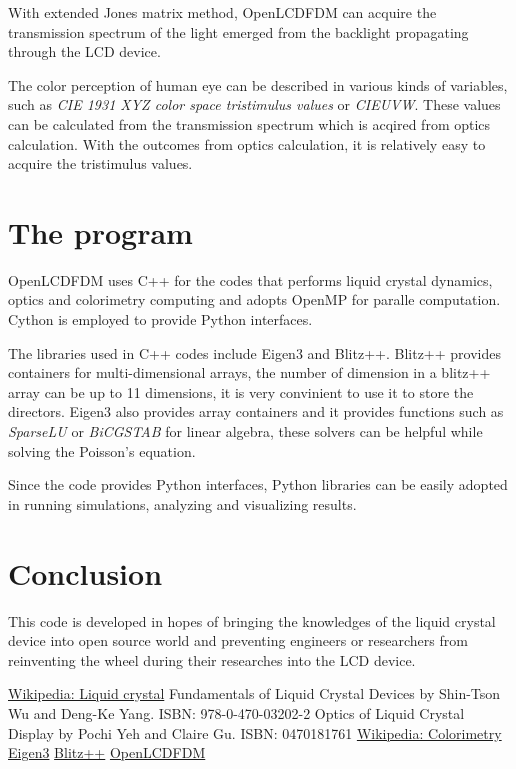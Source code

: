 \documentclass[11pt, a4paper]{article} %
\begin{document}
\begin{multicols}{2}
With extended Jones matrix method, OpenLCDFDM can acquire the transmission spectrum of the light emerged from the backlight propagating through the LCD device.

The color perception of human eye can be described in various kinds of variables, such as \emph{CIE 1931 XYZ color space tristimulus values} or \emph{CIEUVW}\cite{wiki_colorimetry}. These values can be calculated from the transmission spectrum which is acqired from optics calculation. With the outcomes from optics calculation, it is relatively easy to acquire the tristimulus values.

\section{The program}
OpenLCDFDM uses C++ for the codes that performs liquid crystal dynamics, optics and colorimetry computing and adopts OpenMP for paralle computation. Cython is employed to provide Python interfaces. 

The libraries used in C++ codes include Eigen3\cite{libeigen} and Blitz++\cite{blitz}. Blitz++ provides containers for multi-dimensional arrays, the number of dimension in a blitz++ array can be up to 11 dimensions, it is very convinient to use it to store the directors. Eigen3 also provides array containers and it provides functions such as \emph{SparseLU} or \emph{BiCGSTAB} for linear algebra, these solvers can be helpful while solving the Poisson's equation.

Since the code provides Python interfaces, Python libraries can be easily adopted in running simulations, analyzing and visualizing results.

\section{Conclusion}
This code is developed in hopes of bringing the knowledges of the liquid crystal device into open source world and preventing engineers or researchers from reinventing the wheel during their researches into the LCD device.

\begin{thebibliography}{7}
\href{http://en.wikipedia.org/wiki/Liquid_crystal}{Wikipedia: Liquid crystal}
Fundamentals of Liquid Crystal Devices by Shin-Tson Wu and Deng-Ke Yang. ISBN: 978-0-470-03202-2
Optics of Liquid Crystal Display by Pochi Yeh and Claire Gu. ISBN: 0470181761
\href{http://en.wikipedia.org/wiki/Colorimetry}{Wikipedia: Colorimetry}
\href{http://eigen.tuxfamily.org/index.php?title=Main_Page}{Eigen3}
\href{http://sourceforge.net/projects/blitz/}{Blitz++}
\href{https://github.com/xingularity/OpenLCDFDM}{OpenLCDFDM}
\end{thebibliography}
\end{multicols}
\end{document}
